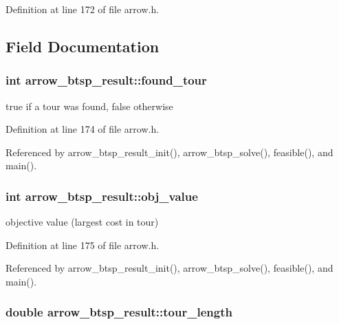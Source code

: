 Definition at line 172 of file arrow.h.

\subsection{Field Documentation}
\hypertarget{structarrow__btsp__result_6ba21b4231cfe2c1e437a9f7e8f31aa6}{
\subsubsection{\setlength{\rightskip}{0pt plus 5cm}int {\bf arrow\_\-btsp\_\-result::found\_\-tour}}}
\label{structarrow__btsp__result_6ba21b4231cfe2c1e437a9f7e8f31aa6}


true if a tour was found, false otherwise 

Definition at line 174 of file arrow.h.

Referenced by arrow\_\-btsp\_\-result\_\-init(), arrow\_\-btsp\_\-solve(), feasible(), and main().\hypertarget{structarrow__btsp__result_ea5f7f45bf61f33ca6b57829da92e041}{
\subsubsection{\setlength{\rightskip}{0pt plus 5cm}int {\bf arrow\_\-btsp\_\-result::obj\_\-value}}}
\label{structarrow__btsp__result_ea5f7f45bf61f33ca6b57829da92e041}


objective value (largest cost in tour) 

Definition at line 175 of file arrow.h.

Referenced by arrow\_\-btsp\_\-result\_\-init(), arrow\_\-btsp\_\-solve(), feasible(), and main().\hypertarget{structarrow__btsp__result_3c0b8827a873df71166e7fe9419c45c2}{
\subsubsection{\setlength{\rightskip}{0pt plus 5cm}double {\bf arrow\_\-btsp\_\-result::tour\_\-length}}}
\label{structarrow__btsp__result_3c0b8827a873df71166e7fe9419c45c2}


